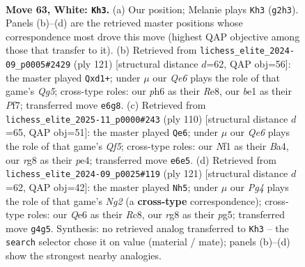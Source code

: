 \documentclass[11pt]{article}
\begin{document}
\clearpage

\begin{figure}[p]\centering
\begin{subfigure}{0.46\textwidth}\centering
\resizebox{\linewidth}{!}{%
\newchessgame
\chessboard[
  setfen={5rr1/p5p1/4Q2p/k2p3P/p2P2P1/1q2P3/6K1/4bN2 w - - 34 63},
  showmover=false,
  pgfstyle=straightmove, color=movearrow, markmove={g2-h3}
]}
\caption{}
\end{subfigure}\hfill
\begin{subfigure}{0.46\textwidth}\centering
\resizebox{\linewidth}{!}{%
\newchessgame
\chessboard[
  setfen={4rk2/5p2/p6p/3R2p1/P1p3q1/2P3P1/1P3P2/3Q2K1 b - - 1 61},
  showmover=false,
  pgfstyle=straightmove, color=movearrow, markmove={g4-d1}
]}
\caption{}
\end{subfigure}
\\[4pt]
\begin{subfigure}{0.46\textwidth}\centering
\resizebox{\linewidth}{!}{%
\newchessgame
\chessboard[
  setfen={3r1k2/4q3/1R1p1p1p/p1pP1Q2/B1P1p1P1/6K1/8/8 w - - 0 56},
  showmover=false,
  pgfstyle=straightmove, color=movearrow, markmove={f5-e6}
]}
\caption{}
\end{subfigure}\hfill
\begin{subfigure}{0.46\textwidth}\centering
\resizebox{\linewidth}{!}{%
\newchessgame
\chessboard[
  setfen={2r3k1/5pn1/2P1p1p1/4q1P1/4P3/p2RQ3/2R3K1/8 b - - 3 61},
  showmover=false,
  pgfstyle=straightmove, color=movearrow, markmove={g7-h5}
]}
\caption{}
\end{subfigure}
\caption{\textbf{Move 63, White: \texttt{Kh3}.} (a) Our position; Melanie plays \texttt{Kh3} (\texttt{g2h3}). Panels (b)--(d) are the retrieved master positions whose correspondence most drove this move (highest QAP objective among those that transfer to it). (b) Retrieved from \texttt{lichess\_elite\_2024-09\_p0005\#2429} (ply 121) [structural distance $d$=62, QAP obj=56]: the master played \texttt{Qxd1+}; under $\mu$ our \emph{Qe6} plays the role of that game's \emph{Qg5}; cross-type roles: our \emph{p}h6 as their \emph{R}e8, our \emph{b}e1 as their \emph{P}f7; transferred move \texttt{e6g8}. (c) Retrieved from \texttt{lichess\_elite\_2025-11\_p0000\#243} (ply 110) [structural distance $d$=65, QAP obj=51]: the master played \texttt{Qe6}; under $\mu$ our \emph{Qe6} plays the role of that game's \emph{Qf5}; cross-type roles: our \emph{N}f1 as their \emph{B}a4, our \emph{r}g8 as their \emph{p}e4; transferred move \texttt{e6e5}. (d) Retrieved from \texttt{lichess\_elite\_2024-09\_p0025\#119} (ply 121) [structural distance $d$=62, QAP obj=42]: the master played \texttt{Nh5}; under $\mu$ our \emph{Pg4} plays the role of that game's \emph{Ng2} (a \textbf{cross-type} correspondence); cross-type roles: our \emph{Q}e6 as their \emph{R}c8, our \emph{r}g8 as their \emph{p}g5; transferred move \texttt{g4g5}. Synthesis: no retrieved analog transferred to \texttt{Kh3} -- the \texttt{search} selector chose it on value (material / mate); panels (b)--(d) show the strongest nearby analogies.}
\label{fig:thought-m124}
\end{figure}
\end{document}
